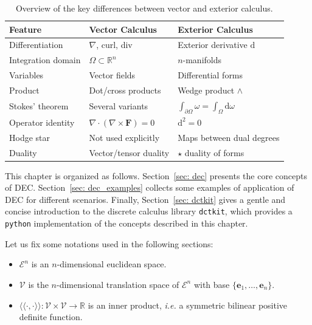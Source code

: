 \documentclass{article}
\theoremstyle{definition} %
\theoremstyle{plain} %
\theoremstyle{remark} %
\newcommand{\rr}{\mathbb{R}}
\newcommand{\VV}{\mathcal{V}}
\newcommand{\llangle}{\langle \langle}
\newcommand{\rrangle}{\rangle \rangle}
\newcommand{\ee}{\mathbf{e}}
\begin{document}
\begin{table}[ht!]
\centering
\begin{tabularx}{\textwidth}{@{}lXX@{}}
\toprule
\textbf{Feature} & \textbf{Vector Calculus} & \textbf{Exterior Calculus} \\ 
\midrule

Differentiation & $\nabla$, curl, div & Exterior derivative $\mathrm{d}$ \\
Integration domain &  $ \Omega \subset \mathbb{R}^n$ & $n$-manifolds\\
Variables & Vector fields & Differential forms \\
Product & Dot/cross products & Wedge product $\wedge$ \\
Stokes' theorem & Several variants & $\int_{\partial \Omega} \omega = \int_{\Omega} \mathrm{d}\omega$ \\
Operator identity & $\nabla \cdot (\nabla \times \mathbf{F}) = 0$ & $\mathrm{d}^2 = 0$ \\
Hodge star & Not used explicitly & Maps between dual degrees \\
Duality & Vector/tensor duality & $\star$ duality of forms \\

\bottomrule
\end{tabularx}
\caption{Overview of the key differences between vector and exterior calculus.}
\label{tab: vc_vs_ec}
\end{table}

This chapter is organized as follows. Section~\ref{sec: dec} presents the core concepts of DEC. Section~\ref{sec: dec_examples} collects some examples of application of DEC for different scenarios. Finally, Section~\ref{sec: dctkit} gives a gentle and concise introduction to the discrete calculus library \texttt{dctkit}, which provides a \texttt{python} implementation of the concepts described in this chapter.

Let us fix some notations used in the following sections: 
\begin{itemize}
    \item $\mathcal{E}^n$ is an $n$-dimensional euclidean space.
    \item $\mathcal{V}$ is the $n$-dimensional translation space of $\mathcal{E}^n$ with base $\{\ee_1, \dots, \ee_n\}$.
    \item $\llangle \cdot , \cdot \rrangle: \VV \times \VV \rightarrow \rr$ is an inner product, \textit{i.e.} a symmetric bilinear positive definite function.
\end{itemize}
\end{document}
